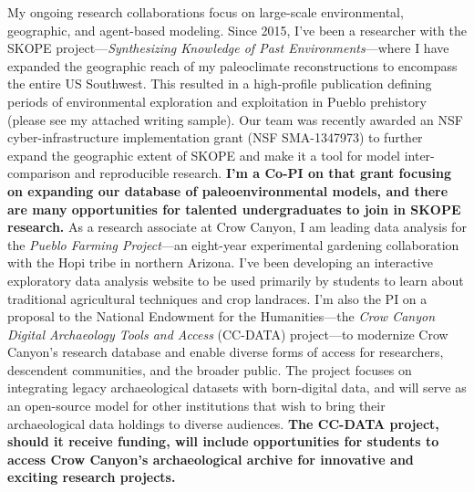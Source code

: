 \documentclass[letterpaper,11pt]{letter}
\begin{document}
\begin{letter}{}
My ongoing research collaborations focus on large-scale environmental, geographic, and agent-based modeling. Since 2015, I've been a researcher with the SKOPE project---\emph{Synthesizing Knowledge of Past Environments}---where I have expanded the geographic reach of my paleoclimate reconstructions\cite{Bocinsky2014_NatComm} to encompass the entire US Southwest. This resulted in a high-profile publication defining periods of environmental exploration and exploitation in Pueblo prehistory\cite{Bocinsky2016_SA} (please see my attached writing sample). Our team was recently awarded an NSF cyber-infrastructure implementation grant (NSF SMA-1347973) to further expand the geographic extent of SKOPE and make it a tool for model inter-comparison and reproducible research. {\bf I'm a Co-PI on that grant focusing on expanding our database of paleoenvironmental models, and there are many opportunities for talented undergraduates to join in SKOPE research.} As a research associate at Crow Canyon, I am leading data analysis for the \emph{Pueblo Farming Project}---an eight-year experimental gardening collaboration with the Hopi tribe in northern Arizona. I've been developing an interactive exploratory data analysis website to be used primarily by students to learn about traditional agricultural techniques and crop landraces. I'm also the PI on a proposal to the National Endowment for the Humanities---the \emph{Crow Canyon Digital Archaeology Tools and Access} (CC-DATA) project---to modernize Crow Canyon’s research database and enable diverse forms of access for researchers, descendent communities, and the broader public. The project focuses on integrating legacy archaeological datasets with born-digital data, and will serve as an open-source model for other institutions that wish to bring their archaeological data holdings to diverse audiences. {\bf The CC-DATA project, should it receive funding, will include opportunities for students to access Crow Canyon's archaeological archive for innovative and exciting research projects.}


\end{letter}
\end{document}
